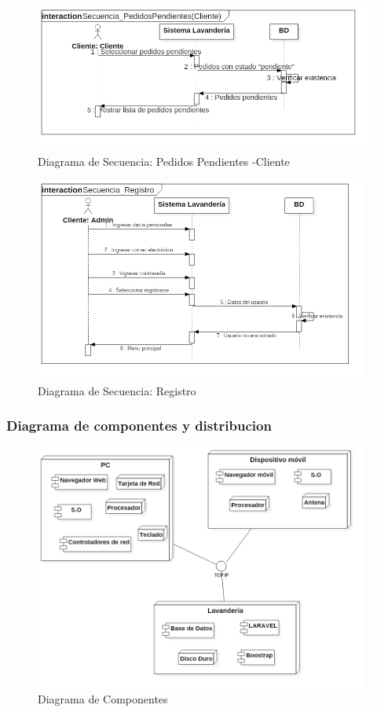 \begin{figure}[htb]
\begin{center}
\includegraphics[width=14cm]{./imagenes/diagramas/Secuencia_PedidosPendientes(Cliente).png}
\end{center}
\caption{Diagrama de Secuencia: Pedidos Pendientes -Cliente}
\end{figure}



\begin{figure}[htb]
\begin{center}
\includegraphics[width=11cm]{./imagenes/diagramas/Secuencia_Registro.png}
\end{center}
\caption{Diagrama de Secuencia: Registro}
\end{figure}

\newpage

\subsubsection{Diagrama de componentes y distribucion}


\begin{figure}[htb]
\begin{center}
\includegraphics[width=11cm]{./imagenes/diagramas/Com-Dis_Lavanderia.png}
\end{center}
\caption{Diagrama de Componentes}
\end{figure}




